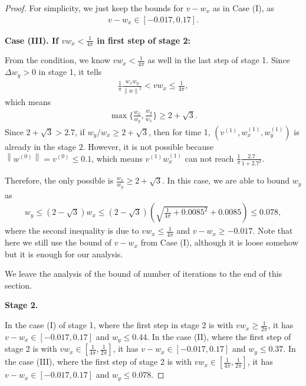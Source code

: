 \documentclass{article}
\theoremstyle{plain}
\theoremstyle{remark}
\newcommand{\norm}[1]{\left\lVert#1\right\rVert}
\newcommand{\T}[1]{^{(#1)}}
\begin{document}
\begin{proof}
For simplicity, we just keep the bounds for $v-w_x$ as in Case (I), as
\begin{align}
    v-w_x\in[-0.017, 0.17].
\end{align}

\textbf{Case (III). If $vw_x<\frac{1}{4\pi}$ in first step of stage 2:}

From the condition, we know $vw_x<\frac{1}{4\pi}$ as well in the last step of stage 1. Since $\Delta w_y>0$ in stage 1, it tells
\begin{align}
    \frac{1}{\pi}\frac{w_x w_y}{\norm{w}^2}<v w_x\le \frac{1}{4\pi},
\end{align}
which means
\begin{align}
    \max\{\frac{w_x}{w_y}, \frac{w_y}{w_x}\}\ge 2+\sqrt{3}.
\end{align}
Since $2+\sqrt{3}>2.7$, if $w_y/w_x\ge 2+\sqrt{3}$, then for time 1, $(v\T{1}, w_x\T{1}, w_y\T{1})$ is already in the stage 2. However, it is not possible because $\norm{w\T{0}}=v\T{0}\le 0.1$, which means $v\T{1} w_x\T{1}$ can not reach $\frac{1}{\pi}\frac{2.7}{1+2.7^2}$.

Therefore, the only possible is $\frac{w_x}{w_y}\ge 2+\sqrt{3}$. In this case, we are able to bound $w_y$ as
\begin{align}
    w_y\le (2-\sqrt{3})w_x\le (2-\sqrt{3})\left(\sqrt{\frac{1}{4\pi}+0.0085^2}+0.0085\right) \le 0.078,
\end{align}
where the second inequality is due to $vw_x\le\frac{1}{4\pi}$ and $v-w_x\ge -0.017$. Note that here we still use the bound of $v-w_x$ from Case (I), although it is loose somehow but it is enough for our analysis.

We leave the analysis of the bound of number of iterations to the end of this section.

\vspace{10pt}
{\centerline{\large{\textbf{Stage 2.}}}}

In the case (I) of stage 1, where the first step in stage 2 is with $v w_x \ge \frac{1}{2\pi}$, it has $v-w_x\in[-0.017, 0.17]$ and $w_y\le 0.44$. In the case (II), where the first step of stage 2 is with $v w_x\in[\frac{1}{4\pi}, \frac{1}{2\pi}]$, it has $v-w_x\in[-0.017, 0.17]$ and $w_y\le 0.37$. In the case (III), where the first step of stage 2 is with $v w_x\in[\frac{1}{4\pi}, \frac{1}{2\pi}]$, it has $v-w_x\in[-0.017, 0.17]$ and $w_y\le 0.078$.


\end{proof}
\end{document}
